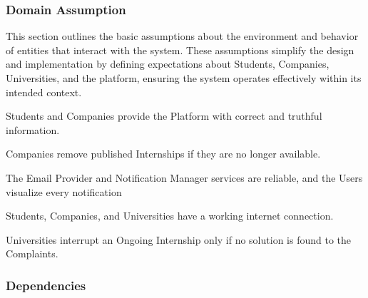 \subsubsection{Domain Assumption}
This section outlines the basic assumptions about the environment and behavior of entities that interact with the system. These assumptions simplify the design and implementation by defining expectations about Students, Companies, Universities, and the platform, ensuring the system operates effectively within its intended context.
\begin{enumerate}[label={\color{titleColor}[D\arabic*]}]
    \item Students and Companies provide the Platform with correct and truthful information.
    \item Companies remove published Internships if they are no longer available.
    \item The Email Provider and Notification Manager services are reliable, and the Users visualize every notification
    \item Students, Companies, and Universities have a working internet connection.
    \item Universities interrupt an Ongoing Internship only if no solution is found to the Complaints.
\end{enumerate}

\subsubsection{Dependencies}